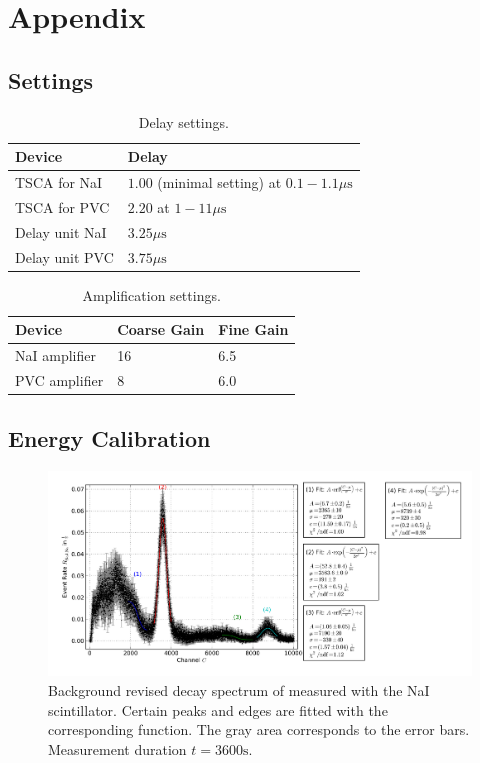 \appendix
\section{Appendix}

\subsection{Settings}
\begin{table}[h!]
  \centering
  \begin{tabular}{ll}
  Device & Delay \\\toprule[1.5pt]
  TSCA for NaI & $1.00$ (minimal setting) at $0.1-1.1\mu \mathrm{s}$ \\
  TSCA for PVC & $2.20$ at $1-11\mu \mathrm{s}$\\
  Delay unit NaI & $3.25\mu \mathrm{s}$\\
  Delay unit PVC & $3.75\mu \mathrm{s}$ \\\bottomrule[1.5pt]
  \end{tabular}
  \caption{Delay settings.}
  \label{tab:delays}
\end{table}

\begin{table}[h!]
  \centering
  \begin{tabular}{lll}
  Device & Coarse Gain & Fine Gain \\\toprule[1.5pt]
  NaI amplifier & 16 & 6.5 \\
  PVC amplifier & 8 & 6.0\\ \bottomrule[1.5pt]
  \end{tabular}
  \caption{Amplification settings.}
  \label{tab:amps}
\end{table}

\FloatBarrier
\subsection{Energy Calibration}

\begin{figure}[h!]
  \centering
  \includegraphics[width=1.0\textwidth]{plots/naj_na.png}
  \caption{Background revised decay spectrum of \Na measured with the NaI
  scintillator. Certain peaks and edges are fitted with the corresponding
  function. The gray area corresponds to the error bars. Measurement
  duration $t=3600\mathrm{s}$.}
  \label{fig:calibNaJNa}
\end{figure}

